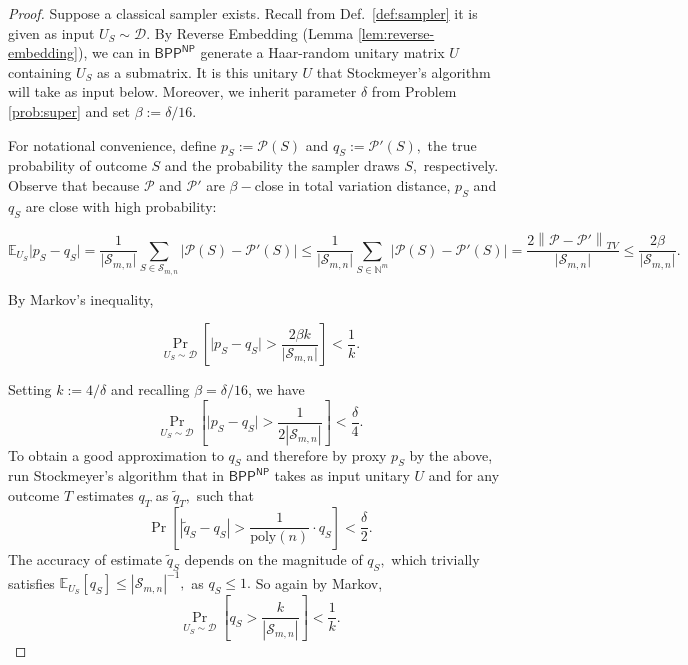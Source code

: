 \documentclass[11pt]{article}
\theoremstyle{plain}
\theoremstyle{plain}
\theoremstyle{plain}
\theoremstyle{plain}
\theoremstyle{plain}
\theoremstyle{plain}
\theoremstyle{plain}
\theoremstyle{remark}
\theoremstyle{remark}
\theoremstyle{plain}
\theoremstyle{plain}
\theoremstyle{plain}
\theoremstyle{plain}
\newcommand{\Smn}{\mathcal{S}_{m,n}}
\newcommand{\norm}[1]{\left\lVert#1\right\rVert}
\newcommand\poly[1]{\mathrm{poly}(#1)}
\begin{document}
\newpage
\begin{proof}
Suppose a classical sampler exists. Recall from Def.~\ref{def:sampler} it is given as input $U_S\sim\mathcal D.$ By Reverse Embedding (Lemma \ref{lem:reverse-embedding}), we can in $\mathsf{BPP}^\mathsf{NP}$ generate a Haar-random unitary matrix $U$ containing $U_S$ as a submatrix. It is this unitary $U$ that Stockmeyer's algorithm will take as input below. Moreover, we inherit parameter $\delta$ from Problem \ref{prob:super} and set $\beta:=\delta/16.$

For notational convenience, define $p_S:=\mathcal P(S)$ and $q_S:= \mathcal{P}'(S),$ the true probability of outcome $S$ and the probability the sampler draws $S,$ respectively. Observe that because $\mathcal P$ and $\mathcal P'$ are $\beta-$close in total variation distance, $p_S$ and $q_S$ are close with high probability:

\[\mathbb E_{U_S} \vert p_S-q_S\vert = 
\frac{1}{\vert\Smn \vert} \sum_{S \in \Smn} \vert \mathcal P(S) -\mathcal{P}'(S) \vert \leq 
\frac{1}{\vert\Smn\vert} \sum_{S \in \mathbb N^m} \vert \mathcal P(S) -\mathcal{P}'(S) \vert =
\frac{2 \norm{\mathcal P - \mathcal P'}_{TV}}{\vert\Smn\vert} \leq
\frac{2\beta}{\vert\Smn\vert}.
\]

By Markov's inequality, 

\[
\Pr_{U_S\sim\mathcal D}\left[ \vert p_S - q_S \vert > \frac{2\beta k}{\vert \Smn\vert} \right] < \frac{1}{k}.
\]

Setting $k := 4/\delta$ and recalling $\beta = \delta / 16$, we have
$$
\Pr_{U_S\sim\mathcal D} \left[ \vert p_S-q_S\vert > \frac{1}{2 |\Smn |} \right] < \frac{\delta}{4}.
$$
To obtain a good approximation to $q_S$ and therefore by proxy $p_S$ by the above, run Stockmeyer's algorithm that in $\mathsf{BPP}^\mathsf{NP}$ takes as input unitary $U$ and for any outcome $T$ estimates $q_T$ as $\widetilde{q}_T,$ such that
\[
\Pr\left[ |\widetilde q_S - q_S| > \frac{1}{\poly{n}}\cdot q_S \right] < \frac{\delta}{2}.
\]
The accuracy of estimate $\widetilde{q}_S$ depends on the magnitude of $q_S,$ which trivially satisfies 
$\mathbb E_{U_S} [q_S] \leq |\Smn|^{-1},$ as $q_S\leq 1.$ So again by Markov, 
\[
\Pr_{U_S\sim\mathcal D} \left[q_S > \frac{k}{|\Smn|}\right] < \frac{1}{k}.
\]


\end{proof}
\end{document}

